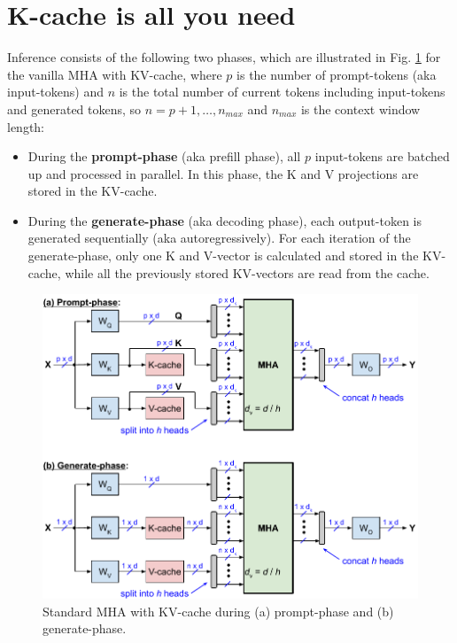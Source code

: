 \documentclass{article}
\begin{document}
\section{K-cache is all you need}
Inference consists of the following two phases, which are illustrated in Fig. \ref{fig2} for the vanilla MHA with KV-cache, where $p$ is the number of prompt-tokens (aka input-tokens) and $n$ is the total number of current tokens including input-tokens and generated tokens, so $n = p+1, \ldots, n_{max}$ and $n_{max}$ is the context window length:
\begin{itemize}[topsep=-1pt, itemsep=-1pt]
  \item During the \textbf{prompt-phase} (aka prefill phase), all $p$ input-tokens are batched up and processed in parallel. In this phase, the K and V projections are stored in the KV-cache.
  \item During the \textbf{generate-phase} (aka decoding phase), each output-token is generated sequentially (aka autoregressively). For each iteration of the generate-phase, only one K and V-vector is calculated and stored in the KV-cache, while all the previously stored KV-vectors are read from the cache.
\end{itemize}
\begin{figure}[h!] \centering
  \includegraphics[scale=0.9]{../doc/fig/slimAttn_fig2.pdf}
  \caption{Standard MHA with KV-cache during (a) prompt-phase and (b) generate-phase.}
\label{fig2} \end{figure}
\end{document}
